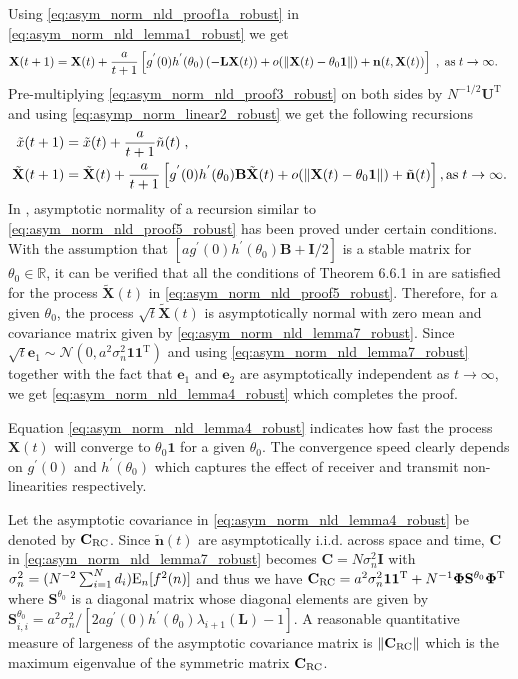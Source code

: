 \documentclass[onecolumn, draft, 12pt]{IEEEtran}
\newcommand{\E}{{\rm E}}
\newcommand{\R}{\mathbb{R}}
\newcommand{\onevect}{\mathbf{1}}
\newcommand{\onevectT}{\mathbf{1}^{\mathrm{T}}}
\newcommand{\La}{\mathbf{L}}
\newcommand{\B}{\mathbf{B}}
\newcommand{\I}{\mathbf{I}}
\newcommand{\e}{\mathbf{e}}
\newcommand{\UT}{\mathbf{U}^{\mathrm{T}}}
\newcommand{\Czero}{\mathbf{C}}
\newcommand{\CSR}{\Czero_{\rm RC}}
\newcommand{\So}{\mathbf{S}}
\newcommand{\Stheta}{\So^{\theta_0}}
\newcommand{\fiN}{\mathbf{\Phi}}
\newcommand{\fiNT}{\mathbf{\Phi}^{\mathrm{T}}}
\newcommand{\X}{\mathbf{X}}
\newcommand{\nv}{\mathbf{n}}
\newcommand{\ntilde}{\tilde{\mathbf{n}}}
\newcommand{\ntildet}{\tilde{\mathbf{n}}(t)}
\newcommand{\xtilde}{\tilde{x}}
\newcommand{\xtildet}{\tilde{x}(t)}
\newcommand{\Xtilde}{\tilde{\mathbf{X}}}
\newcommand{\Xtildet}{\tilde{\mathbf{X}}(t)}
\begin{document}
\begin{IEEEproof}
Using \eqref{eq:asym_norm_nld_proof1a_robust} in \eqref{eq:asym_norm_nld_lemma1_robust} we get
\begin{align} \label{eq:asym_norm_nld_proof3_robust}
\X(t+1)    & = \X(t) + \frac{a}{t+1} \left [ g^{'}(0) h^{'}(\theta_0) \left( -\La \X(t) \right)  + o(\|\X(t)-\theta_0 \onevect\|)  + \nv(t,\X(t)) \right ]\;, \; {\rm as} \; t \rightarrow \infty.
\end{align}
Pre-multiplying \eqref{eq:asym_norm_nld_proof3_robust} on both sides by $ N^{-1/2} \UT$ and using \eqref{eq:asymp_norm_linear2_robust} we get the following recursions 
\begin{align} \label{eq:asym_norm_nld_proof4_robust}
\xtilde(t+1) & = \xtildet + \frac{a}{t+1} \tilde{n}(t)\;, \\
\label{eq:asym_norm_nld_proof5_robust}
\Xtilde(t+1) & = \Xtildet + \frac{a}{t+1} \left [ g^{'}(0) h^{'}(\theta_0) \B \Xtildet + o(\|\X(t)-\theta_0 \onevect\|) + \ntildet \right ], {\rm as} \; t \rightarrow \infty.
\end{align}
In \cite{Nevelson1973}, asymptotic normality  of a recursion similar to \eqref{eq:asym_norm_nld_proof5_robust} has been proved  under certain conditions. With the assumption that $\left [a g^{'}(0) h^{'}(\theta_0) \B + \I / 2 \right ]$ is a stable matrix for $\theta_0 \in \R$, it can be verified that all the conditions of Theorem 6.6.1 in \cite[p. 147]{Nevelson1973} are satisfied for the process $\Xtildet$ in \eqref{eq:asym_norm_nld_proof5_robust}. Therefore, for a given $\theta_0$, the process $\sqrt{t} \Xtildet$ is asymptotically normal with zero mean and covariance matrix given by \eqref{eq:asym_norm_nld_lemma7_robust}. Since $\sqrt{t} \e_1 \sim \mathcal{N} (0, a^2 \sigma^2_{n} \onevect \onevectT)$ and using \eqref{eq:asym_norm_nld_lemma7_robust} together with the fact that $\e_1$ and $\e_2$ are asymptotically independent as $t \rightarrow \infty$, we get \eqref{eq:asym_norm_nld_lemma4_robust} which completes the proof.
\end{IEEEproof}

Equation \eqref{eq:asym_norm_nld_lemma4_robust} indicates how fast the process $\X(t)$ will converge to $\theta_0 \onevect$ for a given $\theta_0$. The convergence speed clearly depends on $g^{'}(0)$ and $h^{'}(\theta_0)$ which captures the effect of receiver and transmit non-linearities respectively. 

Let the asymptotic covariance in \eqref{eq:asym_norm_nld_lemma4_robust} be denoted by $\CSR$. Since $\ntilde(t)$ are asymptotically i.i.d. across space and time, $\Czero$ in \eqref{eq:asym_norm_nld_lemma7_robust} becomes $\Czero= N \sigma^2_{n} \I$ with $\sigma^2_{n} = ( N^{-2}  \sum_{i=1}^{N} d_i ) \E_n [f^2(n)]$ and thus we have $\CSR= a^2 \sigma^2_{n} \onevect \onevectT + N^{-1} \fiN \Stheta \fiNT $ where $\Stheta$ is a diagonal matrix whose diagonal elements are given by $\Stheta_{i,i} = a^2 \sigma^2_{n} / [2 a g^{'}(0) h^{'}(\theta_0) \lambda_{i+1}(\La) -1]$. A reasonable quantitative measure of largeness \cite{Polyak1981} of the asymptotic covariance matrix is  $ \| \CSR \| $ which is the maximum eigenvalue of the symmetric matrix $\CSR$. 
\end{document}
